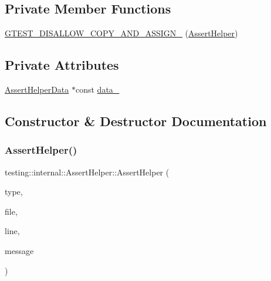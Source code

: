 \subsection*{Private Member Functions}
\begin{DoxyCompactItemize}
\item 
\hyperlink{classtesting_1_1internal_1_1AssertHelper_a264544ac41950b296c34253d2e656b10}{G\+T\+E\+S\+T\+\_\+\+D\+I\+S\+A\+L\+L\+O\+W\+\_\+\+C\+O\+P\+Y\+\_\+\+A\+N\+D\+\_\+\+A\+S\+S\+I\+G\+N\+\_\+} (\hyperlink{classtesting_1_1internal_1_1AssertHelper}{Assert\+Helper})
\end{DoxyCompactItemize}
\subsection*{Private Attributes}
\begin{DoxyCompactItemize}
\item 
\hyperlink{structtesting_1_1internal_1_1AssertHelper_1_1AssertHelperData}{Assert\+Helper\+Data} $\ast$const \hyperlink{classtesting_1_1internal_1_1AssertHelper_af69a4d66a929d0c6e419f4efd3ba6b3a}{data\+\_\+}
\end{DoxyCompactItemize}


\subsection{Constructor \& Destructor Documentation}
\mbox{\label{classtesting_1_1internal_1_1AssertHelper_ac2c9334518fd4087189b4505567a3c90}} 
\subsubsection{\texorpdfstring{Assert\+Helper()}{AssertHelper()}}
{\footnotesize\ttfamily testing\+::internal\+::\+Assert\+Helper\+::\+Assert\+Helper (\begin{DoxyParamCaption}\item[{Test\+Part\+Result\+::\+Type}]{type,  }\item[{const char $\ast$}]{file,  }\item[{int}]{line,  }\item[{const char $\ast$}]{message }\end{DoxyParamCaption})}

